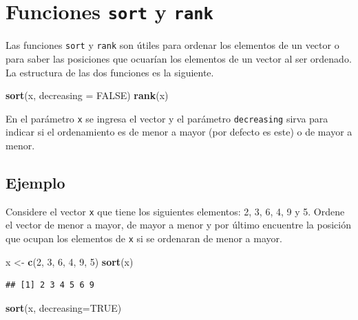 \documentclass[10pt,]{krantz}
\makeatletter
\newenvironment{Shaded}{\begin{snugshade}}{\end{snugshade}}
\newcommand{\KeywordTok}[1]{\textcolor[rgb]{0.13,0.29,0.53}{\textbf{{#1}}}}
\newcommand{\DataTypeTok}[1]{\textcolor[rgb]{0.13,0.29,0.53}{{#1}}}
\newcommand{\DecValTok}[1]{\textcolor[rgb]{0.00,0.00,0.81}{{#1}}}
\newcommand{\StringTok}[1]{\textcolor[rgb]{0.31,0.60,0.02}{{#1}}}
\newcommand{\OtherTok}[1]{\textcolor[rgb]{0.56,0.35,0.01}{{#1}}}
\newcommand{\NormalTok}[1]{{#1}}
\newenvironment{kframe}{%
\medskip{}
\setlength{\fboxsep}{.8em}
 \def\at@end@of@kframe{}%
 \ifinner\ifhmode%
  \def\at@end@of@kframe{\end{minipage}}%
  \begin{minipage}{\columnwidth}%
 \fi\fi%
 \def\FrameCommand##1{\hskip\@totalleftmargin \hskip-\fboxsep
 \colorbox{shadecolor}{##1}\hskip-\fboxsep
     \hskip-\linewidth \hskip-\@totalleftmargin \hskip\columnwidth}%
 \MakeFramed {\advance\hsize-\width
   \@totalleftmargin\z@ \linewidth\hsize
   \@setminipage}}%
 {\par\unskip\endMakeFramed%
 \at@end@of@kframe}
\renewenvironment{Shaded}{\begin{kframe}}{\end{kframe}}
\makeatother
\begin{document}
\section{\texorpdfstring{Funciones \texttt{sort} y \texttt{rank}
  
}{Funciones sort y rank    }}\label{funciones-sort-y-rank}

Las funciones \texttt{sort} y \texttt{rank} son útiles para ordenar los
elementos de un vector o para saber las posiciones que ocuarían los
elementos de un vector al ser ordenado. La estructura de las dos
funciones es la siguiente.

\begin{Shaded}
\begin{Highlighting}[]
\KeywordTok{sort}\NormalTok{(x, }\DataTypeTok{decreasing =} \OtherTok{FALSE}\NormalTok{)}
\KeywordTok{rank}\NormalTok{(x)}
\end{Highlighting}
\end{Shaded}

En el parámetro \texttt{x} se ingresa el vector y el parámetro
\texttt{decreasing} sirva para indicar si el ordenamiento es de menor a
mayor (por defecto es este) o de mayor a menor.

\subsection*{Ejemplo}\label{ejemplo-14}


Considere el vector \texttt{x} que tiene los siguientes elementos: 2, 3,
6, 4, 9 y 5. Ordene el vector de menor a mayor, de mayor a menor y por
último encuentre la posición que ocupan los elementos de \texttt{x} si
se ordenaran de menor a mayor.

\begin{Shaded}
\begin{Highlighting}[]
\NormalTok{x <-}\StringTok{ }\KeywordTok{c}\NormalTok{(}\DecValTok{2}\NormalTok{, }\DecValTok{3}\NormalTok{, }\DecValTok{6}\NormalTok{, }\DecValTok{4}\NormalTok{, }\DecValTok{9}\NormalTok{, }\DecValTok{5}\NormalTok{)}
\KeywordTok{sort}\NormalTok{(x)}
\end{Highlighting}
\end{Shaded}

\begin{verbatim}
## [1] 2 3 4 5 6 9
\end{verbatim}

\begin{Shaded}
\begin{Highlighting}[]
\KeywordTok{sort}\NormalTok{(x, }\DataTypeTok{decreasing=}\OtherTok{TRUE}\NormalTok{)}
\end{Highlighting}
\end{Shaded}
\end{document}
